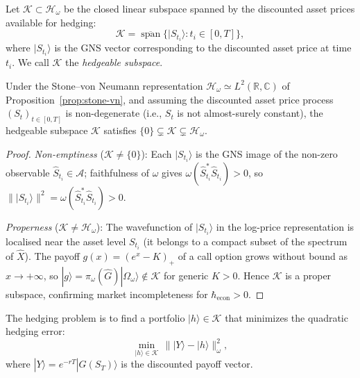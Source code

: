 \begin{definition}\label{def:hedgeable-subspace-t}
Let $\mathcal{K} \subset \mathcal{H}_\omega$ be the closed linear subspace spanned
by the discounted asset prices available for hedging:
\begin{equation*}
    \mathcal{K} = \overline{\operatorname{span}}
        \{|S_{t_i}\rangle : t_i \in [0, T]\},
\end{equation*}
where $|S_{t_i}\rangle$ is the GNS vector corresponding to the discounted asset
price at time $t_i$. We call $\mathcal{K}$ the \emph{hedgeable subspace}.
\end{definition}

\begin{lemma}\label{lem:K-nontrivial}
Under the Stone--von Neumann representation
$\mathcal{H}_\omega \simeq L^2(\mathbb{R},\mathbb{C})$ of
Proposition~\ref{prop:stone-vn}, and assuming the discounted asset price process
$(S_t)_{t \in [0,T]}$ is non-degenerate (i.e., $S_t$ is not almost-surely constant),
the hedgeable subspace $\mathcal{K}$ satisfies
$\{0\} \subsetneq \mathcal{K} \subsetneq \mathcal{H}_\omega$.
\end{lemma}

\begin{proof}
\emph{Non-emptiness} ($\mathcal{K} \neq \{0\}$): Each $|S_{t_i}\rangle$ is the
GNS image of the non-zero observable $\hat{S}_{t_i} \in \mathcal{A}$; faithfulness
of $\omega$ gives $\omega(\hat{S}_{t_i}^* \hat{S}_{t_i}) > 0$, so
$\||S_{t_i}\rangle\|^2 = \omega(\hat{S}_{t_i}^*\hat{S}_{t_i}) > 0$.

\emph{Properness} ($\mathcal{K} \neq \mathcal{H}_\omega$): The wavefunction of
$|S_{t_i}\rangle$ in the log-price representation is localised near the asset
level $S_{t_i}$ (it belongs to a compact subset of the spectrum of $\hat{X}$).
The payoff $g(x)=(e^x - K)_+$ of a call option grows without bound as
$x \to +\infty$, so $|g\rangle = \pi_\omega(\hat{G})|\Omega_\omega\rangle \notin
\mathcal{K}$ for generic $K > 0$. Hence $\mathcal{K}$ is a proper subspace,
confirming market incompleteness for $\hbar_{\mathrm{econ}} > 0$.
\end{proof}

The hedging problem is to find a portfolio $|h\rangle \in \mathcal{K}$ that
minimizes the quadratic hedging error:
\begin{equation}\label{eq:hedging-error}
    \min_{|h\rangle \in \mathcal{K}} \, \| |Y\rangle - |h\rangle \|_\omega^2,
\end{equation}
where $|Y\rangle = e^{-rT} |G(S_T)\rangle$ is the discounted payoff vector.

